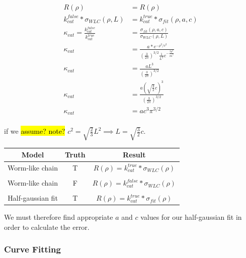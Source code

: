 \documentclass[../../AdvancementSummary.tex]{subfiles}
\begin{document}
\begin{align*}
R(\rho) &= R(\rho) \\
k^{false}_{cat}*\sigma_{WLC}(\rho, L) &= k^{true}_{cat}*\sigma_{fit}(\rho, a, c) \\
\kappa_{cat} = \frac{k^{false}_{cat}}{k^{true}_{cat}} &= \frac{\sigma_{fit}(\rho, a, c)}{\sigma_{WLC}(\rho, L)} \\
\kappa_{cat} &= \frac{a*e^{-\rho^2/c^2}}{\left(\frac{3}{2\pi}\right)^{3/2} \frac{1}{L^3}e^{-\frac{3\rho^2}{2L^2}}} \\
\kappa_{cat} &= \frac{aL^3}{\left(\frac{3}{2\pi}\right)^{3/2}} \\
\kappa_{cat} &= \frac{a\left(\sqrt{\frac{3}{2}}c\right)^3}{\left(\frac{3}{2\pi}\right)^{3/2} } \\
\kappa_{cat} &= ac^3\pi^{3/2}\\
\end{align*}

if we \hl{assume? note?} $c^2 = \sqrt{\frac{2}{3}}L^2 \implies L = \sqrt{\frac{3}{2}}c$.

\begin{center}
\begin{tabular}{| c | c | c |}
    \hline
        Model & Truth & Result \\ 
        \hline 
        Worm-like chain     &   T   &   $R(\rho) = k^{true}_{cat}*\sigma_{WLC}(\rho)$    \\
        & & \\
        Worm-like chain     &   F   &   $R(\rho) = k^{false}_{cat}*\sigma_{WLC}(\rho)$   \\ 
        & & \\
        Half-gaussian fit   &   T   &   $R(\rho) = k^{true}_{cat}*\sigma_{fit}(\rho)$    \\
    \hline
\end{tabular}
\end{center}


We must therefore find appropriate $a$ and $c$ values for our half-gaussian fit in order to calculate the error.

\subsubsection{Curve Fitting}

\end{document}
